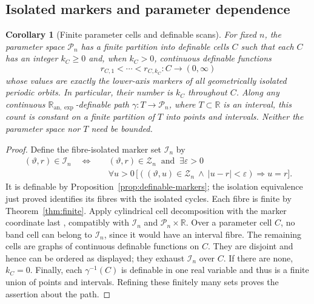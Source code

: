 \documentclass[11pt]{article}
\newtheorem{corollary}[theorem]{Corollary}
\theoremstyle{remark}
\newcommand{\R}{\mathbb R}
\newcommand{\Ranexp}{\mathbb R_{\mathrm{an},\exp}}
\begin{document}
\subsection{Isolated markers and parameter dependence}

\begin{corollary}[Finite parameter cells and definable scans]
\label{cor:parameter-cells}
For fixed \(n\), the parameter space \(\mathcal P_n\) has a finite
partition into definable cells \(C\) such that each \(C\) has an integer
\(k_C\ge0\) and, when \(k_C>0\), continuous definable functions
\[
 r_{C,1}<\cdots<r_{C,k_C}:C\longrightarrow(0,\infty)
\]
whose values are exactly the lower-axis markers of all geometrically
isolated periodic orbits.  In particular, their number is \(k_C\)
throughout \(C\).  Along any continuous \(\Ranexp\)-definable path
\(\gamma:T\to\mathcal P_n\), where \(T\subset\R\) is an interval,
this count is constant on a finite partition of \(T\) into points and
intervals.  Neither the parameter space nor \(T\) need be bounded.
\end{corollary}
\begin{proof}
Define the fibre-isolated marker set \(\mathcal I_n\) by
\begin{equation}\label{eq:isolated-markers}
\begin{aligned}
 (\vartheta,r)\in\mathcal I_n\quad\Longleftrightarrow\quad
 &(\vartheta,r)\in\mathcal Z_n\ \text{ and }\ \exists\varepsilon>0\\
 &\forall u>0\,
 \bigl[((\vartheta,u)\in\mathcal Z_n\ \wedge\ |u-r|<\varepsilon)
                                  \Longrightarrow u=r\bigr].
\end{aligned}
\end{equation}
It is definable by Proposition~\ref{prop:definable-markers}; the isolation
equivalence just proved identifies its fibres with the isolated cycles.
Each fibre is finite by Theorem~\ref{thm:finite}.  Apply cylindrical
cell decomposition with the marker coordinate last
\cite[Section~4.2]{vdm}, compatibly with \(\mathcal I_n\) and
\(\mathcal P_n\times\R\).  Over a parameter cell \(C\), no band cell
can belong to \(\mathcal I_n\), since it would have an interval fibre.
The remaining cells are graphs of continuous definable functions on
\(C\).  They are disjoint and hence can be ordered as displayed; they
exhaust \(\mathcal I_n\) over \(C\).  If there are none, \(k_C=0\).
Finally, each \(\gamma^{-1}(C)\) is definable in one real variable and
thus is a finite union of points and intervals.  Refining these finitely
many sets proves the assertion about the path.
\end{proof}
\end{document}
